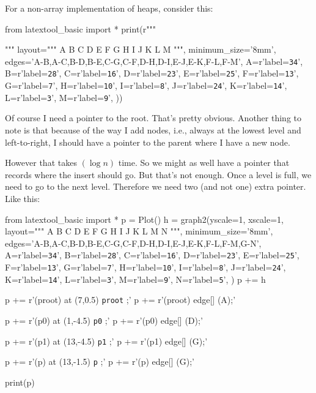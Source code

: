 For a non-array implementation of heaps,
consider this:

\begin{python}
from latextool_basic import *
print(r"""
\begin{center}
\end{center}
""" %
layout="""
        A 
    B       C 
  D   E   F   G
 H I J K L M 
""",
minimum_size='8mm',
edges='A-B,A-C,B-D,B-E,C-G,C-F,D-H,D-I,E-J,E-K,F-L,F-M',
A=r'label=\texttt{34}',
B=r'label=\texttt{28}',
C=r'label=\texttt{16}',
D=r'label=\texttt{23}',
E=r'label=\texttt{25}',
F=r'label=\texttt{13}',
G=r'label=\texttt{7}',
H=r'label=\texttt{10}',
I=r'label=\texttt{8}',
J=r'label=\texttt{24}',
K=r'label=\texttt{14}',
L=r'label=\texttt{3}',
M=r'label=\texttt{9}',
))
\end{python}

Of course I need a pointer to the root.
That's pretty obvious.
Another thing to note is that because of the way I add nodes,
i.e., always at the lowest level and left-to-right, I should have a pointer
to the parent where I have a new node.



However that takes $(\log n)$ time.
So we might as well have a pointer that records where the
insert should go.
But that's not enough.
Once a level is full, we need to go to the next level.
Therefore we need two (and not one) extra pointer.
Like this:

\begin{python}
from latextool_basic import *
p = Plot()
h = graph2(yscale=1, xscale=1,
layout="""
        A 
    B       C 
  D   E   F   G
 H I J K L M N
""",
minimum_size='8mm',
edges='A-B,A-C,B-D,B-E,C-G,C-F,D-H,D-I,E-J,E-K,F-L,F-M,G-N',
A=r'label=\texttt{34}',
B=r'label=\texttt{28}',
C=r'label=\texttt{16}',
D=r'label=\texttt{23}',
E=r'label=\texttt{25}',
F=r'label=\texttt{13}',
G=r'label=\texttt{7}',
H=r'label=\texttt{10}',
I=r'label=\texttt{8}',
J=r'label=\texttt{24}',
K=r'label=\texttt{14}',
L=r'label=\texttt{3}',
M=r'label=\texttt{9}',
N=r'label=\texttt{5}',
)
p += h

p += r'\node (proot) at (7,0.5) {\texttt{proot}} ;'
p += r'\path [-triangle 60] (proot) edge[] (A);'

p += r'\node (p0) at (1,-4.5) {\texttt{p0}} ;'
p += r'\path [-triangle 60] (p0) edge[] (D);'

p += r'\node (p1) at (13,-4.5) {\texttt{p1}} ;'
p += r'\path [-triangle 60] (p1) edge[] (G);'

p += r'\node (p) at (13,-1.5) {\texttt{p}} ;'
p += r'\path [-triangle 60] (p) edge[] (G);'

print(p)
\end{python}

